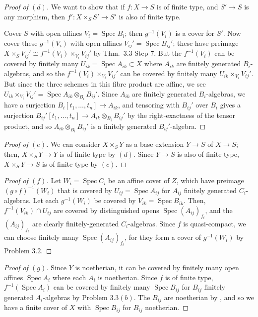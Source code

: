 \documentclass[12pt,letterpaper]{article}
\theoremstyle{definition}
\theoremstyle{remark}
\numberwithin{equation}{section}
\numberwithin{figure}{problem}
\DeclareMathOperator{\Spec}{Spec}
\begin{document}
\begin{proof}[Proof of $(d)$]
  We want to show that if $f\colon X \to S$ is of finite type, and $S' \to S$ is any morphism, then $f'\colon X \times_S S' \to S'$ is also of finite type.
  \par Cover $S$ with open affines $V_i = \Spec B_i$; then $g^{-1}(V_i)$ is a cover for $S'$. Now cover these $g^{-1}(V_i)$ with open affines $V_{ij}' = \Spec B_{ij}'$; these have preimage $X \times_S V_{ij}' \cong f^{-1}(V_i) \times_{V_i} V_{ij}'$ by Thm.~3.3 Step 7. But the $f^{-1}(V_i)$ can be covered by finitely many $U_{ik} = \Spec A_{ik} \subset X$ where $A_{ik}$ are finitely generated $B_i$-algebras, and so the $f^{-1}(V_i) \times_{V_i} V_{ij}'$ can be covered by finitely many $U_{ik} \times_{V_i} V_{ij}'$. But since the three schemes in this fibre product are affine, we see $U_{ik} \times_{V_i} V_{ij}' = \Spec A_{ik} \otimes_{B_i} B_{ij}'$. Since $A_{ik}$ are finitely generated $B_i$-algebras, we have a surjection $B_i[t_1,\ldots,t_n] \to A_{ik}$, and tensoring with $B_{ij}'$ over $B_i$ gives a surjection $B_{ij}'[t_1,\ldots,t_n] \to A_{ik} \otimes_{B_i} B_{ij}'$ by the right-exactness of the tensor product, and so $A_{ik} \otimes_{B_i} B_{ij}'$ is a finitely generated $B_{ij}'$-algebra.
\end{proof}
\begin{proof}[Proof of $(e)$]
  We can consider $X \times_S Y$ as a base extension $Y \to S$ of $X \to S$; then, $X \times_S Y \to Y$ is of finite type by $(d)$. Since $Y \to S$ is also of finite type, $X \times_S Y \to S$ is of finite type by $(c)$.
\end{proof}
\begin{proof}[Proof of $(f)$]
  Let $W_i = \Spec C_i$ be an affine cover of $Z$, which have preimage $(g \circ f)^{-1}(W_i)$ that is covered by $U_{ij} = \Spec A_{ij}$ for $A_{ij}$ finitely generated $C_i$-algebras. Let each $g^{-1}(W_i)$ be covered by $V_{ik} = \Spec B_{ik}$. Then, $f^{-1}(V_{ik}) \cap U_{ij}$ are covered by distinguished opens $\Spec (A_{ij})_{f_\ell}$, and the $(A_{ij})_{f_\ell}$ are clearly finitely-generated $C_i$-algebras. Since $f$ is quasi-compact, we can choose finitely many $\Spec(A_{ij})_{f_\ell}$, for they form a cover of $g^{-1}(W_i)$ by Problem $3.2$.
\end{proof}
\begin{proof}[Proof of $(g)$]
  Since $Y$ is noetherian, it can be covered by finitely many open affines $\Spec A_i$ where each $A_i$ is noetherian. Since $f$ is of finite type, $f^{-1}(\Spec A_i)$ can be covered by finitely many $\Spec B_{ij}$ for $B_{ij}$ finitely generated $A_i$-algebras by Problem $3.3(b)$. The $B_{ij}$ are noetherian by \cite[Cor.~7.7]{AM69}, and so we have a finite cover of $X$ with $\Spec B_{ij}$ for $B_{ij}$ noetherian.
\end{proof}
\end{document}
